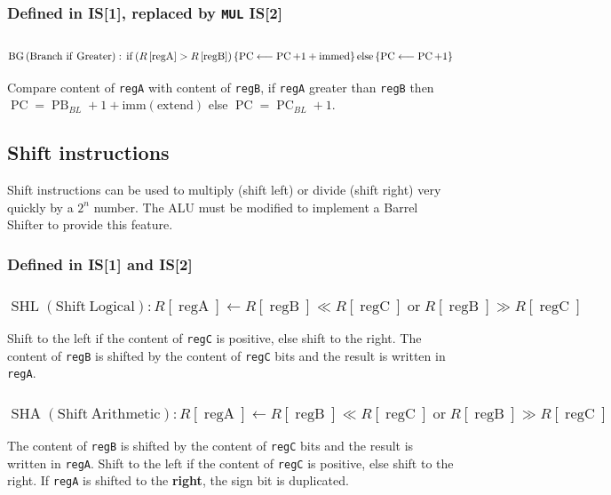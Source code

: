 \documentclass[10pt,a4paper]{article}
\theoremstyle{definition}%
\newcommand{\on}[1]{\operatorname{#1}}
\newcommand{\reg}[1]{\texttt{reg#1}}
\begin{document}
\subsubsection*{ Defined in IS[1], replaced by \texttt{MUL} IS[2]}

\subsubsection{$\on{BG} \on{(Branch~if~Greater)}:\newline \on{if} \left( R\left[ \on{regA} \right] > R\left[ \on{regB} \right]\right) \left\lbrace\on{PC} \longleftarrow \on{PC}+1+\on{immed} \right\rbrace\on{else} \left\lbrace\on{PC} \longleftarrow \on{PC}+1\right\rbrace $}
Compare content of \reg{A} with content of \reg{B}, if \reg{A} greater than \reg{B} then\\$\on{PC}=\on{PB}_{BL}+1+\on{imm(extend)}$ else $\on{PC}=\on{PC}_{BL}+1$.

\subsection{Shift instructions}

Shift instructions can be used to multiply (shift left) or divide (shift right) very quickly by a $2^n$ number. The ALU must be modified to implement a Barrel Shifter to provide this feature.
\subsubsection*{ Defined in IS[1] and IS[2]}
\subsubsection{$\on{SHL} \on{(Shift~ Logical)} : R\left[ \on{regA} \right] \longleftarrow    R\left[ \on{regB} \right] \ll R\left[ \on{regC} \right] \on{or}  R\left[ \on{regB} \right] \gg R\left[ \on{regC} \right] $}
Shift to the left if the content of \reg{C} is positive, else shift to the right. The content of \reg{B} is shifted by the content of \reg{C} bits and the result is written in \reg{A}.

\subsubsection{$\on{SHA} \on{(Shift ~Arithmetic)} : R\left[ \on{regA} \right] \longleftarrow    R\left[ \on{regB} \right] \ll R\left[ \on{regC} \right] \on{or}  R\left[ \on{regB} \right] \gg R\left[ \on{regC} \right] $}
The content of \reg{B} is shifted by the content of \reg{C} bits and the result is written in \reg{A}.
Shift to the left if the content of \reg{C} is positive, else shift to the right.
If \reg{A} is shifted to the \textbf{right}, the sign bit is duplicated.
\end{document}
